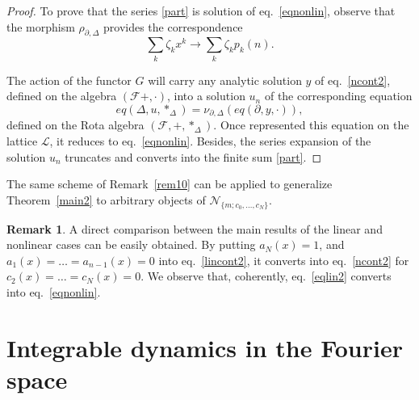 \documentclass[10pt]{amsart}
\numberwithin{equation}{section}
\theoremstyle{definition}
\newtheorem{remark}{\textbf{Remark}}
\begin{document}
\begin{proof}
To prove that the series \eqref{part} is solution of eq.~\eqref{eqnonlin}, observe that the morphism
$\rho _{\partial ,\Delta}$ provides the correspondence
\begin{equation}
\sum _{k} \zeta _{k} x^{k} \longrightarrow \sum _{k} \zeta _{k} p_{k}(n).
\label{eq5.28}
\end{equation}

The action of the functor $G$ will carry any analytic solution $y$ of eq.~\eqref{ncont2},
defined on the algebra $(\mathcal{F}+,\cdot )$, into a solution
$u_{n}$ of the corresponding equation
\begin{equation*}
eq(\Delta ,u,*_{\Delta})=\nu _{\partial ,\Delta}(eq(\partial , y,
\cdot )),
\end{equation*}
defined on the Rota algebra $(\mathcal{F},+,*_{\Delta})$. Once represented
this equation on the lattice $\mathcal{L}$, it reduces to eq.~\eqref{eqnonlin}. Besides, the series expansion of the solution
$u_{n}$ truncates and converts into the finite sum  \eqref{part}.
\end{proof}

The same scheme of Remark~\ref{rem10} can be applied to generalize  Theorem~\ref{main2} to arbitrary objects of
$\mathcal{N}_{\{m; c_{0},\ldots , c_{N}\}}$.

\begin{remark}
\label{rem4}
A direct comparison between the main results of the linear and nonlinear
cases can be easily obtained. By putting $a_{N}(x)=1$, and
$a_{1}(x)=\ldots = a_{n-1}(x)=0$ into  eq.~\eqref{lincont2}, it converts
into  eq.~\eqref{ncont2} for $c_{2}(x)=\ldots =c_{N}(x)=0$. We observe that,
coherently,  eq.~\eqref{eqlin2} converts into  eq.~\eqref{eqnonlin}.
\end{remark}

\section{Integrable dynamics in the Fourier space}
\label{sec:6}
\end{document}
